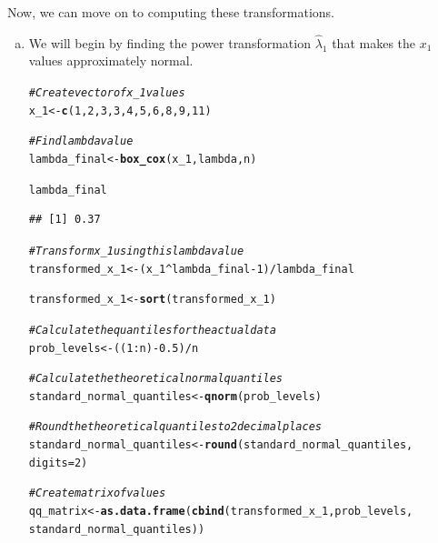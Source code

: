 \documentclass[12pt]{article}\usepackage[]{graphicx}\usepackage[]{color}
\makeatletter
\newcommand{\hlnum}[1]{\textcolor[rgb]{0.686,0.059,0.569}{#1}}%
\newcommand{\hlcom}[1]{\textcolor[rgb]{0.678,0.584,0.686}{\textit{#1}}}%
\newcommand{\hlopt}[1]{\textcolor[rgb]{0,0,0}{#1}}%
\newcommand{\hlstd}[1]{\textcolor[rgb]{0.345,0.345,0.345}{#1}}%
\newcommand{\hlkwb}[1]{\textcolor[rgb]{0.69,0.353,0.396}{#1}}%
\newcommand{\hlkwc}[1]{\textcolor[rgb]{0.333,0.667,0.333}{#1}}%
\newcommand{\hlkwd}[1]{\textcolor[rgb]{0.737,0.353,0.396}{\textbf{#1}}}%
\newenvironment{kframe}{%
 \def\at@end@of@kframe{}%
 \ifinner\ifhmode%
  \def\at@end@of@kframe{\end{minipage}}%
  \begin{minipage}{\columnwidth}%
 \fi\fi%
 \def\FrameCommand##1{\hskip\@totalleftmargin \hskip-\fboxsep
 \colorbox{shadecolor}{##1}\hskip-\fboxsep
     \hskip-\linewidth \hskip-\@totalleftmargin \hskip\columnwidth}%
 \MakeFramed {\advance\hsize-\width
   \@totalleftmargin\z@ \linewidth\hsize
   \@setminipage}}%
 {\par\unskip\endMakeFramed%
 \at@end@of@kframe}
\newenvironment{knitrout}{}{} %
\makeatother
\begin{document}
Now, we can move on to computing these transformations.

\begin{enumerate}[a)]

\item We will begin by finding the power transformation $\hat{\lambda}_1$ that makes the $x_1$ values approximately normal.

\begin{knitrout}
\color{fgcolor}\begin{kframe}
\begin{alltt}
\hlcom{#Create vector of x_1 values}
\hlstd{x_1} \hlkwb{<-} \hlkwd{c}\hlstd{(}\hlnum{1}\hlstd{,} \hlnum{2}\hlstd{,} \hlnum{3}\hlstd{,} \hlnum{3}\hlstd{,} \hlnum{4}\hlstd{,} \hlnum{5}\hlstd{,} \hlnum{6}\hlstd{,} \hlnum{8}\hlstd{,} \hlnum{9}\hlstd{,} \hlnum{11}\hlstd{)}

\hlcom{#Find lambda value}
\hlstd{lambda_final} \hlkwb{<-} \hlkwd{box_cox}\hlstd{(x_1, lambda, n)}

\hlstd{lambda_final}
\end{alltt}
\begin{verbatim}
## [1] 0.37
\end{verbatim}
\begin{alltt}
\hlcom{#Transform x_1 using this lambda value}
\hlstd{transformed_x_1} \hlkwb{<-} \hlstd{(x_1}\hlopt{^}\hlstd{lambda_final} \hlopt{-} \hlnum{1}\hlstd{)}\hlopt{/}\hlstd{lambda_final}

\hlstd{transformed_x_1} \hlkwb{<-} \hlkwd{sort}\hlstd{(transformed_x_1)}

\hlcom{#Calculate the quantiles for the actual data}
\hlstd{prob_levels} \hlkwb{<-} \hlstd{((}\hlnum{1}\hlopt{:}\hlstd{n)}\hlopt{-}\hlnum{0.5}\hlstd{)}\hlopt{/}\hlstd{n}

\hlcom{#Calculate the theoretical normal quantiles}
\hlstd{standard_normal_quantiles} \hlkwb{<-} \hlkwd{qnorm}\hlstd{(prob_levels)}

\hlcom{#Round the theoretical quantiles to 2 decimal places}
\hlstd{standard_normal_quantiles} \hlkwb{<-} \hlkwd{round}\hlstd{(standard_normal_quantiles,}
                                   \hlkwc{digits} \hlstd{=} \hlnum{2}\hlstd{)}

\hlcom{#Create matrix of values}
\hlstd{qq_matrix} \hlkwb{<-} \hlkwd{as.data.frame}\hlstd{(}\hlkwd{cbind}\hlstd{(transformed_x_1, prob_levels,}
                                 \hlstd{standard_normal_quantiles))}


\end{alltt}
\end{kframe}
\end{knitrout}
\end{enumerate}
\end{document}
